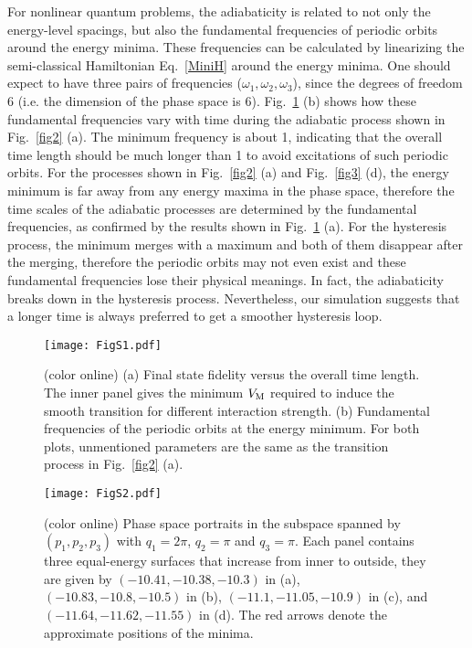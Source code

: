 \documentclass[twocolumn,prl,floatfix,citeautoscript,nofootinbib]{revtex4-1}
\begin{document}
\begin{appendix}
For nonlinear quantum problems, the adiabaticity is related to
not only the energy-level spacings, but also the fundamental frequencies of
periodic orbits around the energy minima.
These frequencies can be calculated by linearizing the
semi-classical Hamiltonian Eq.~\ref{MiniH} around the energy minima.
One should expect to have three pairs of frequencies ($\omega_1,\omega_2,\omega_3$),
since the degrees of freedom $6$ (i.e. the dimension of the
phase space is 6).
Fig.~\ref{figs1} (b) shows how these fundamental frequencies
vary with time during the adiabatic process shown in Fig.~\ref{fig2} (a).
The minimum frequency is about 1,
indicating that the overall time length should be much longer than
1 to avoid excitations of such periodic orbits.
For the processes shown in
Fig.~\ref{fig2} (a) and Fig.~\ref{fig3} (d),
the energy minimum is far away from any energy
maxima in the phase space, therefore the time scales of the adiabatic processes are determined by
the fundamental frequencies, as confirmed by the results shown in
Fig.~\ref{figs1} (a).
For the hysteresis process, the minimum
merges with a maximum and both of them disappear after the merging, therefore the periodic orbits
may not even exist and these fundamental frequencies lose their physical
meanings.
In fact, the adiabaticity breaks down in the hysteresis process.
Nevertheless, our simulation suggests that a longer time is always preferred
to get a smoother hysteresis loop.

\begin{figure}[t]
    \centering
    \texttt{[image: FigS1.pdf]}
    \caption{(color online) (a) Final state fidelity versus the overall time length.
    The inner panel gives
    the minimum $V_{\rm{M}}$ required to induce the smooth transition for different interaction strength.
    (b) Fundamental frequencies of the periodic orbits at the energy minimum.
    For both plots, unmentioned parameters are the same as the transition process in Fig.~\ref{fig2} (a).}
    \label{figs1}
\end{figure}

\begin{figure}[t]
    \centering
    \texttt{[image: FigS2.pdf]}
    \caption{(color online) Phase space portraits in the subspace spanned by $(p_1,p_2,p_3)$ with
    $q_1=2\pi$, $q_2=\pi$ and $q_3=\pi$.
    Each panel contains three equal-energy surfaces that increase from inner to outside, they are given by $(-10.41,-10.38,-10.3)$ in (a), $(-10.83,-10.8,-10.5)$ in (b), $(-11.1,-11.05,-10.9)$ in (c), and  $(-11.64,-11.62,-11.55)$ in (d). The red arrows denote the approximate positions of the minima.}
    \label{figs2}
\end{figure}


\end{appendix}
\end{document}

